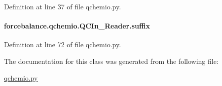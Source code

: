 Definition at line 37 of file qchemio.\-py.

\hypertarget{classforcebalance_1_1qchemio_1_1QCIn__Reader_ae20caa518b899a0f26916966625ca40c}{
\paragraph[{suffix}]{\setlength{\rightskip}{0pt plus 5cm}forcebalance.\-qchemio.\-Q\-C\-In\-\_\-\-Reader.\-suffix}}\label{classforcebalance_1_1qchemio_1_1QCIn__Reader_ae20caa518b899a0f26916966625ca40c}


Definition at line 72 of file qchemio.\-py.



The documentation for this class was generated from the following file\-:\begin{DoxyCompactItemize}
\item 
\hyperlink{qchemio_8py}{qchemio.\-py}\end{DoxyCompactItemize}

